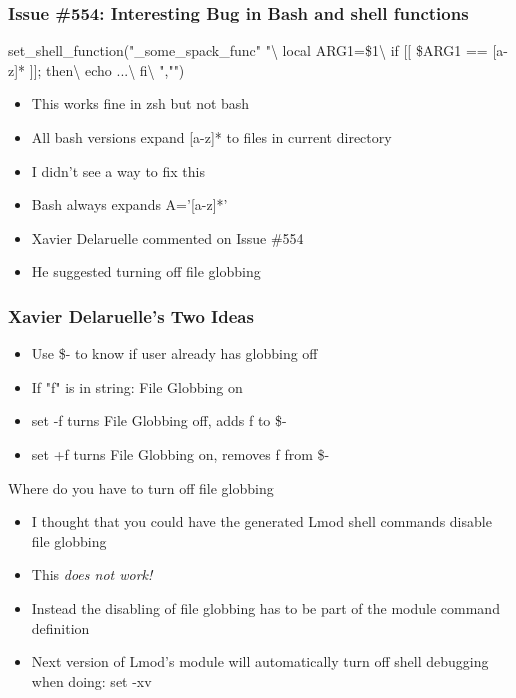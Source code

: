 \documentclass{beamer}
\begin{document}
\begin{frame}[fragile]
  \frametitle{Issue \#554: Interesting Bug in Bash and shell functions}
    {\tiny
\begin{semiverbatim}
    set_shell_function("_some_spack_func" "\textbackslash
       local ARG1=\$1\textbackslash
       if [[ \$ARG1 == {\color{red}[a-z]*} ]]; then\textbackslash
         echo ...\textbackslash
       fi\textbackslash
    ","")
\end{semiverbatim}
    }
  \begin{itemize}
    \item This works fine in zsh but not bash
    \item All bash versions expand [a-z]\** to files in current directory
    \item I didn't see a way to fix this
    \item Bash always expands {\color{blue}A='[a-z]\**'}
    \item Xavier Delaruelle commented on Issue \#554
    \item He suggested turning off file globbing
  \end{itemize}
\end{frame}

\begin{frame}[fragile]
  \frametitle{Xavier Delaruelle's Two Ideas}
    {\tiny
{}
    }
  \begin{itemize}
    \item Use \$- to know if user already has globbing off
    \item If "f" is in string: File Globbing on
    \item set -f turns File Globbing off, adds f to \$-
    \item set +f turns File Globbing on, removes f from \$-
  \end{itemize}
\end{frame}


\begin{frame}{Where do you have to turn off file globbing }
  \begin{itemize}
    \item I thought that you could have the generated Lmod shell
      commands disable file globbing
    \item This \emph{does not work!}
    \item Instead the disabling of file globbing  has to be part of the module
      command definition
    \item Next version of Lmod's module will automatically turn off
      shell debugging when doing: set -xv
  \end{itemize}
\end{frame}
\end{document}

